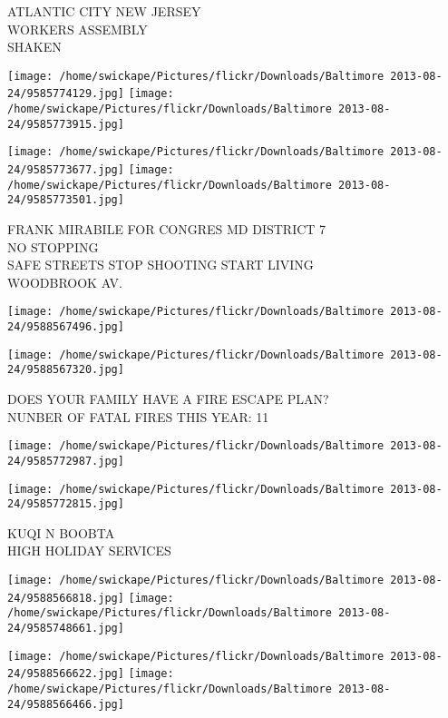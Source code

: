 \documentclass[10pt,letterpaper]{article}
\begin{document}
ATLANTIC CITY NEW JERSEY\\
WORKERS ASSEMBLY\\
SHAKEN\\
\pagebreak

\texttt{[image: /home/swickape/Pictures/flickr/Downloads/Baltimore 2013-08-24/9585774129.jpg]}
\texttt{[image: /home/swickape/Pictures/flickr/Downloads/Baltimore 2013-08-24/9585773915.jpg]}

\texttt{[image: /home/swickape/Pictures/flickr/Downloads/Baltimore 2013-08-24/9585773677.jpg]}
\texttt{[image: /home/swickape/Pictures/flickr/Downloads/Baltimore 2013-08-24/9585773501.jpg]}

FRANK MIRABILE FOR CONGRES MD DISTRICT 7\\
NO STOPPING\\
SAFE STREETS STOP SHOOTING START LIVING\\
WOODBROOK AV.\\
\pagebreak

\texttt{[image: /home/swickape/Pictures/flickr/Downloads/Baltimore 2013-08-24/9588567496.jpg]}

\vspace{0.25in}
\texttt{[image: /home/swickape/Pictures/flickr/Downloads/Baltimore 2013-08-24/9588567320.jpg]}

DOES YOUR FAMILY HAVE A FIRE ESCAPE PLAN?\\
NUNBER OF FATAL FIRES THIS YEAR: 11\\
\pagebreak

\texttt{[image: /home/swickape/Pictures/flickr/Downloads/Baltimore 2013-08-24/9585772987.jpg]}

\vspace{0.25in}
\texttt{[image: /home/swickape/Pictures/flickr/Downloads/Baltimore 2013-08-24/9585772815.jpg]}

KUQI N BOOBTA\\
HIGH HOLIDAY SERVICES\\
\pagebreak

\texttt{[image: /home/swickape/Pictures/flickr/Downloads/Baltimore 2013-08-24/9588566818.jpg]}
\texttt{[image: /home/swickape/Pictures/flickr/Downloads/Baltimore 2013-08-24/9585748661.jpg]}

\texttt{[image: /home/swickape/Pictures/flickr/Downloads/Baltimore 2013-08-24/9588566622.jpg]}
\texttt{[image: /home/swickape/Pictures/flickr/Downloads/Baltimore 2013-08-24/9588566466.jpg]}
\end{document}
